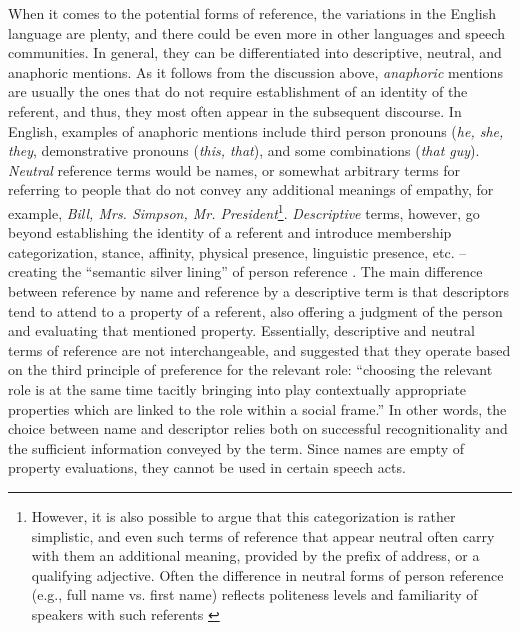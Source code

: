 \documentclass[12pt, draft]{article}
\begin{document}
When it comes to the potential forms of reference, the variations in the English language are plenty, and there could be even more in other languages and speech communities. In general, they can be differentiated into descriptive, neutral, and anaphoric mentions. As it follows from the discussion above, \textit{anaphoric} mentions are usually the ones that do not require establishment of an identity of the referent, and thus, they most often appear in the subsequent discourse. In English, examples of anaphoric mentions include third person pronouns (\textit{he, she, they}, demonstrative pronouns (\textit{this, that}), and some combinations (\textit{that guy}). \textit{Neutral} reference terms would be names, or somewhat arbitrary terms for referring to people that do not convey any additional meanings of empathy, for example, \textit{Bill, Mrs. Simpson, Mr. President}\footnote{However, it is also possible to argue that this categorization is rather simplistic, and even such terms of reference that appear neutral often carry with them an additional meaning, provided by the prefix of address, or a qualifying adjective. Often the difference in neutral forms of person reference (e.g., full name vs. first name) reflects politeness levels and familiarity of speakers with such referents \parencite{downing1996}}. \textit{Descriptive} terms, however, go beyond establishing the identity of a referent and introduce membership categorization, stance, affinity, physical presence, linguistic presence, etc. -- creating the ``semantic silver lining'' of person reference \parencite[p.132]{defornel1987}. The main difference between reference by name and reference by a descriptive term is that descriptors tend to attend to a property of a referent, also offering a judgment of the person and evaluating that mentioned property. Essentially, descriptive and neutral terms of reference are not interchangeable, and \textcite[p.136]{defornel1987} suggested that they operate based on the third principle of preference for the relevant role: ``choosing the relevant role is at the same time tacitly bringing into play contextually appropriate properties which are linked to the role within a social frame.'' In other words, the choice between name and descriptor relies both on successful recognitionality and the sufficient information conveyed by the term. Since names are empty of property evaluations, they cannot be used in certain speech acts.
\end{document}
